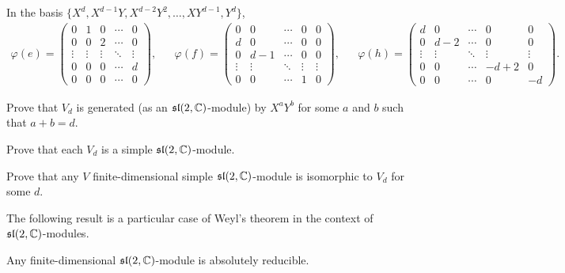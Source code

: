 In the basis $\{X^d,X^{d-1}Y,X^{d-2}Y^2,\dots,XY^{d-1},Y^d\}$, 
\begin{align*}
\varphi(e)=\left(\begin{smallmatrix}
0 & 1 & 0 & \cdots & 0\\
0 & 0 & 2 & \cdots & 0\\
\vdots & \vdots & \vdots & \ddots & \vdots\\
0 & 0 & 0 & \cdots & d\\
0 & 0 & 0 & \cdots & 0
\end{smallmatrix}\right),
&& 
\varphi(f)=\left(\begin{smallmatrix}
0 & 0 & \cdots & 0 & 0\\
d & 0 & \cdots & 0 & 0\\
0 & d-1 & \cdots & 0 & 0\\
\vdots & \vdots & \ddots & \vdots & \vdots\\
0 & 0 & \cdots & 1 & 0
\end{smallmatrix}\right),
&&
\varphi(h)=\left(\begin{smallmatrix}
d & 0 & \cdots & 0 & 0\\
0 & d-2 & \cdots & 0 & 0\\
\vdots & \vdots & \ddots & \vdots & \vdots\\
0 & 0 & \cdots & -d+2 & 0\\
0 & 0 & \cdots & 0 & -d
\end{smallmatrix}\right).
\end{align*}

\begin{exercise}
    Prove that $V_d$ is generated (as an $\mathfrak{sl}(2,\mathbb{C})$-module) by
    $X^aY^b$ for some $a$ and $b$ such that $a+b=d$. 
\end{exercise}

\begin{exercise}
    Prove that each $V_d$ is a simple $\mathfrak{sl}(2,\mathbb{C})$-module.
\end{exercise}

\begin{exercise}
    Prove that any $V$ finite-dimensional simple 
    $\mathfrak{sl}(2,\mathbb{C})$-module is isomorphic to $V_d$ for some $d$. 
\end{exercise}

The following result is a particular
case of Weyl's theorem in the context of $\mathfrak{sl}(2,\mathbb{C})$-modules. 

\begin{theorem}
    Any finite-dimensional $\mathfrak{sl}(2,\mathbb{C})$-module is absolutely reducible. 
\end{theorem}

